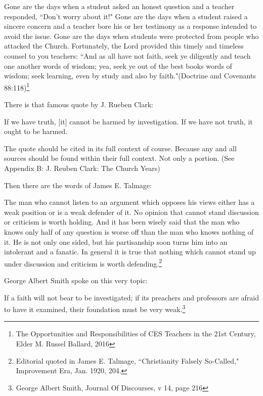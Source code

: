 \documentclass{article}
\begin{document}
\begin{displayquote}
Gone are the days when a student asked an honest question and a teacher 
responded, ``Don’t worry about it!" Gone are the days when a student raised a 
sincere concern and a teacher bore his or her testimony as a response intended 
to avoid the issue. Gone are the days when students were protected from people 
who attacked the Church. Fortunately, the Lord provided this timely and 
timeless counsel to you teachers: ``And as all have not faith, seek ye 
diligently and teach one another words of wisdom; yea, seek ye out of the best 
books words of wisdom; seek learning, even by study and also by 
faith."(Doctrine and Covenants 88:118)\footnote{The Opportunities and 
Responsibilities of CES Teachers in the 21st Century, 
Elder M. Russel Ballard, 2016}
\end{displayquote}

There is that famous quote by J. Rueben Clark:

\begin{displayquote}
If we have truth, [it] cannot be harmed by investigation. 
If we have not truth, it ought to be 
harmed.\cite{clark}
\end{displayquote}

The quote should be cited in its full context of course. Because any and all 
sources should be found within their full context. Not only a portion. 
(See Appendix B: J. Reuben Clark: The Church Years)

Then there are the words of James E. Talmage:

\begin{displayquote}
The man who cannot listen to an argument which opposes his views either has a 
weak position or is a weak defender of it. No opinion that cannot stand 
discussion or criticism is worth holding. And it has been wisely said that the 
man who knows only half of any question is worse off than the man who knows 
nothing of it. He is not only one sided, but his partisanship soon turns him 
into an intolerant and a fanatic. In general it is true that nothing which 
cannot stand up under discussion and criticism is worth 
defending.\footnote{Editorial quoted in James E. Talmage, 
``Christianity Falsely So-Called," Improvement Era, Jan. 1920, 204.}
\end{displayquote}

George Albert Smith spoke on this very topic:

\begin{displayquote}
If a faith will not bear to be investigated; if its preachers and professors 
are afraid to have it examined, their foundation must be very 
weak.\footnote{George Albert Smith, Journal Of Discourses, v 14, page 216}
\end{displayquote}
\end{document}
